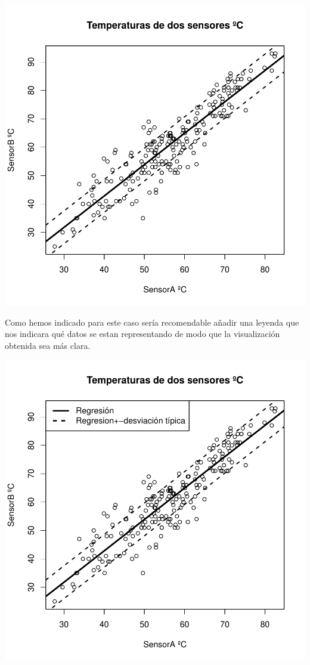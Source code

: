 \documentclass [a4paper] {article}
\begin{document}
\begin{center}
\includegraphics{entrega-temp_reg_plot}
\end{center}

Como hemos indicado para este caso sería recomendable añadir una leyenda que nos indicara qué datos se estan representando de modo que la visualización obtenida sea más clara.
\begin{center}
\includegraphics{entrega-temp_plot_legend}
\end{center}
\end{document}
